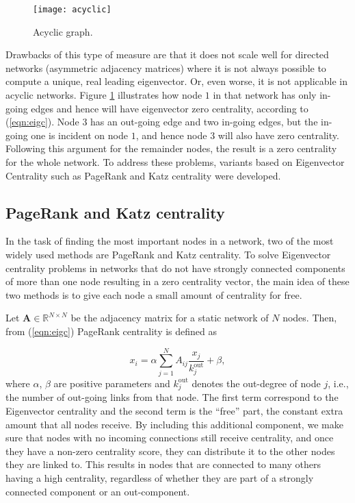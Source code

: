 \begin{figure}[h]\centering
	\texttt{[image: acyclic]}
	\caption{Acyclic graph.}
	\label{fig:acyclic}
	\bigskip
\end{figure}

Drawbacks of this type of measure are that it does not scale well for directed networks (asymmetric adjacency matrices) where it is not always possible to compute a unique, real leading eigenvector. Or, even worse, it is not applicable in acyclic networks. Figure \ref{fig:acyclic} illustrates how node $1$ in that network has only in-going edges and hence will have eigenvector zero centrality, according to (\ref{eqn:eigc}). Node $3$ has an out-going edge and two in-going edges, but the in-going one is incident on node $1$, and hence node $3$ will also have zero centrality. Following this argument for the remainder nodes, the result is a zero centrality for the whole network. To address these problems, variants based on Eigenvector Centrality such as PageRank and Katz centrality were developed.

\subsection*{PageRank and Katz centrality}
In the task of finding the most important nodes in a network, two of the most widely used methods are PageRank and Katz centrality. To solve Eigenvector centrality problems in networks that do not have strongly connected components of more than one node resulting in a zero centrality vector, the main idea of these two methods is to give each node a small amount of centrality for free. 

Let $\mathbf{A}\in\mathbb{R}^{N\times N}$ be the adjacency matrix for a static network of $N$ nodes. Then, from (\ref{eqn:eigc}) PageRank centrality is defined as

\begin{equation}
\label{eqn:pr1}
    x_i= \alpha\sum_{j=1}^{N}A_{ij}\frac{x_j}{k_j^{\text{out}}} + \beta,
\end{equation}
where $\alpha$, $\beta$ are positive parameters and $k_j^{\text{out}}$ denotes the out-degree of node $j$, i.e., the number of out-going links from that node. The first term correspond to the Eigenvector centrality and the second term is the “free” part, the constant extra amount that all nodes receive. By including this additional component, we make sure that nodes with no incoming connections still receive centrality, and once they have a non-zero centrality score, they can distribute it to the other nodes they are linked to. This results in nodes that are connected to many others having a high centrality, regardless of whether they are part of a strongly connected component or an out-component.

